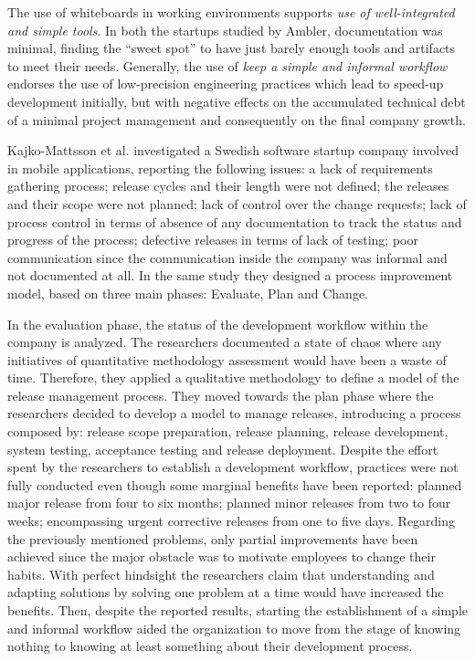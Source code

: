 \documentclass[10pt,journal,letterpaper,compsoc]{IEEEtran}
\begin{document}
The use of whiteboards in working environments supports \textit{use of well-integrated and simple tools}. In both the startups studied by Ambler, documentation was minimal, finding the ``sweet spot'' to have just barely enough tools and artifacts to meet their needs. Generally, the use of \textit{keep a simple and informal workflow} endorses the use of low-precision engineering practices which lead to speed-up development initially, but with negative effects on the accumulated technical debt of a minimal project management and consequently on the final company growth. 

Kajko-Mattsson et al. \cite{Kajko-Mattsson2008} investigated a Swedish software startup company involved in mobile applications, reporting the following issues: a lack of requirements gathering process; release cycles and their length were not defined; the releases and their scope were not planned; lack of control over the change requests; lack of process control in terms of  absence of any documentation to track the status and progress of the process; defective releases in terms of lack of testing; poor communication since the communication inside the company was informal and not documented at all. In the same study they designed a process improvement model, based on three main phases: Evaluate, Plan and Change. 

In the evaluation phase, the status of the development workflow within the company  is analyzed. The researchers documented a state of chaos where any initiatives of quantitative methodology assessment would have been a waste of time. Therefore, they applied a qualitative methodology to define a model of the release management process. They moved towards the plan phase where the researchers decided to develop a model to manage releases, introducing a process composed by: release scope preparation, release planning, release development, system testing, acceptance testing and release deployment. Despite the effort spent by the researchers to establish a development workflow, practices were not fully conducted even though some marginal benefits have been reported: planned major release from four to six months; planned minor releases from two to four weeks; encompassing urgent corrective releases from one to five days. Regarding the previously mentioned problems, only 
partial improvements have been achieved since the major obstacle was to motivate employees to change their habits. With perfect hindsight the researchers claim that understanding and adapting solutions by solving one problem at a time would have increased the benefits. Then, despite the reported results, starting the establishment of a simple and informal workflow aided the organization to move from the stage of knowing nothing to knowing at least something about their development process. 
\end{document}
